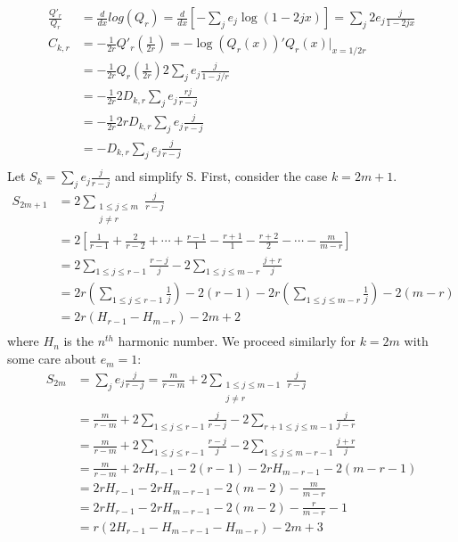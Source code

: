 \documentclass{article}
\begin{document}
$$ 
\begin{aligned}
    \frac{Q'_{r}}{Q_r} &= \frac{d}{dx}log(Q_r) = \frac{d}{dx}\left[ -\sum_{j} e_j\log(1-2jx) \right]=  \sum_{j} 2e_j\frac{j}{1-2jx}  \\
    C_{k,r} &= - \frac{1}{2r}Q'_r\left (\frac{1}{2r} \right) = -\log(Q_r(x))'Q_r(x)|_{x=1/{2r}} \\
    &= -\frac{1}{2r} Q_r\left(\frac{1}{2r}\right) 2\sum_{j} e_j\frac{j}{1-j/r} \\ 
    &= -\frac{1}{2r} 2 D_{k,r}\sum_{j}e_j\frac{rj }{r-j} \\
    &= - \frac{1}{2r}2r D_{k,r}\sum_{j}e_j \frac{j}{r-j} \\
    &= - D_{k,r}\sum_{j}e_j \frac{j}{r-j} \\
\end{aligned}
$$
Let $S_k=\sum_{j}e_j\frac{j}{r-j}$ and simplify S. First, consider the case $k=2m+1$. 
$$
\begin{aligned}
    S_{2m+1} &=  2\sum_{\substack{1 \leq j \leq m \\ j \neq r}}\frac{j}{r-j} \\ 
    &= 2\left[\frac{1}{r-1}+\frac{2}{r-2} + \cdots  + \frac{r-1}{1}-\frac{r+1}{1}-\frac{r+2}{2}-\cdots-\frac{m}{m-r}\right]\\
    &= 2\sum_{1 \leq j \leq r-1}\frac{r-j}{j} -2\sum_{1 \leq j \leq m-r}\frac{j+r}{j} \\
    &= 2r\left(\sum_{1 \leq j \leq r-1}\frac{1}{j}\right) - 2(r-1) - 2r\left(\sum_{1 \leq j \leq m-r}\frac{1}{j}\right)-2(m-r)\\
    &= 2r(H_{r-1}-H_{m-r})-2m+2 \\
\end{aligned}
$$
where $H_n$ is the $n^{th}$ harmonic number. We proceed similarly for $k=2m$ with some care about $e_{m}=1$:
$$
\begin{aligned}
    S_{2m} &= \sum_{j}e_j \frac{j}{r-j} = \frac{m}{r-m} + 2\sum_{\substack{1 \leq j \leq m-1 \\ j \neq r}}\frac{j}{r-j}\\ 
    &= \frac{m}{r-m} + 2 \sum_{1 \leq j \leq r-1} \frac{j}{r-j} - 2\sum_{r+1 \leq j \leq m-1}\frac{j}{j-r} \\
    &= \frac{m}{r-m} + 2\sum_{1 \leq j \leq r-1}\frac{r-j}{j} -2\sum_{1 \leq j \leq m-r-1}\frac{j+r}{j} \\
    &= \frac{m}{r-m} + 2rH_{r-1}-2(r-1)-2rH_{m-r-1}-2(m-r-1) \\
    &=  2rH_{r-1} - 2rH_{m-r-1}-2(m-2)-\frac{m}{m-r}  \\
    &= 2rH_{r-1} - 2rH_{m-r-1} - 2(m-2) - \frac{r}{m-r} -1 \\
    &= r\left(2H_{r-1} - H_{m-r-1}-H_{m-r}\right) - 2m + 3
\end{aligned}
$$
\end{document}
